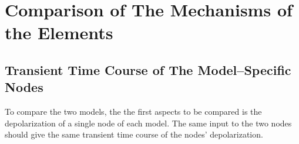 %		
%
%
%
%





\section{Comparison of The Mechanisms of the Elements}
\label{secComparisonOfMechanismsOfNodeElements}
	\subsection{Transient Time Course of The Model--Specific Nodes}

To compare %
			the two models, the the first aspects to be compared is the depolarization  of a single node of each model.
The same input to the two nodes should give the same transient time course of the nodes' depolarization.

